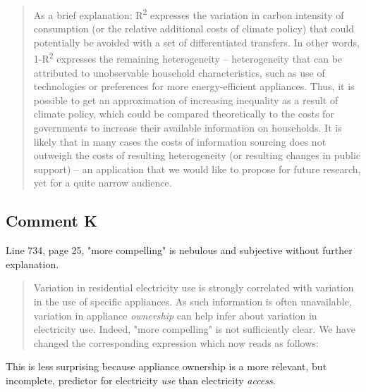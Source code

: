 \documentclass[11pt]{article}
\newenvironment{response}
{\begin{quote}\color{black}}
{\end{quote}}
\begin{document}
\begin{response}
    As a brief explanation: R\textsuperscript{2} expresses the variation in carbon intensity of consumption (or the relative additional costs of climate policy) that could potentially be avoided with a set of differentiated transfers. In other words, 1-R\textsuperscript{2} expresses the remaining heterogeneity -- heterogeneity that can be attributed to unobservable household characteristics, such as use of technologies or preferences for more energy-efficient appliances. Thus, it is possible to get an approximation of increasing inequality as a result of climate policy, which could be compared theoretically to the costs for governments to increase their available information on households. It is likely that in many cases the costs of information sourcing does not outweigh the costs of resulting heterogeneity (or resulting changes in public support) -- an application that we would like to propose for future research, yet for a quite narrow audience.
\end{response}    

\subsection*{Comment K}\label{comment_R1_K}

\begin{commentbox}
    Line 734, page 25, "more compelling" is nebulous and subjective without further explanation.
\end{commentbox}

\begin{response}
    Variation in residential electricity use is strongly correlated with variation in the use of specific appliances. As such information is often unavailable, variation in appliance \textit{ownership} can help infer about variation in electricity use. Indeed, "more compelling" is not sufficiently clear. We have changed the corresponding expression which now reads as follows:
\end{response}  

\begin{revisionbox}
   This is less surprising because appliance ownership is a more relevant, but incomplete, predictor for electricity \textit{use} than electricity \textit{access}.
\end{revisionbox}
\end{document}
